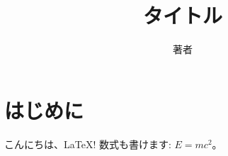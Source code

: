 \documentclass[uplatex,dvipdfmx]{jsarticle}
\title{タイトル}
\author{著者}
\begin{document}
\maketitle

\section{はじめに}
こんにちは、\LaTeX! 数式も書けます: $E = mc^2$。
\end{document}
